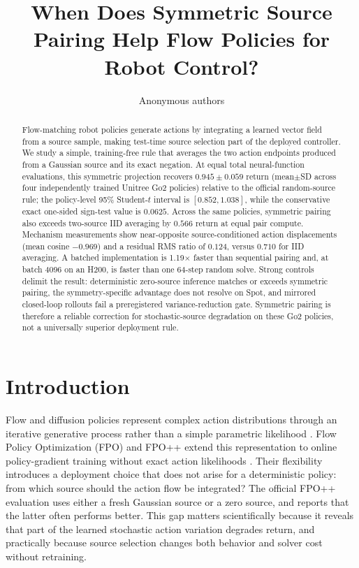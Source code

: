 \documentclass{article}
\title{When Does Symmetric Source Pairing Help Flow Policies for Robot Control?}
\author{Anonymous authors}
\begin{document}
\maketitle

\begin{abstract}
Flow-matching robot policies generate actions by integrating a learned vector
field from a source sample, making test-time source selection part of the
deployed controller. We study a simple, training-free rule that averages the
two action endpoints produced from a Gaussian source and its exact negation.
At equal total neural-function evaluations, this symmetric projection recovers
$0.945\pm0.059$ return (mean$\pm$SD across four independently trained Unitree
Go2 policies) relative to the official random-source rule; the policy-level
95\% Student-$t$ interval is $[0.852,1.038]$, while the conservative exact
one-sided sign-test value is $0.0625$. Across the same policies, symmetric
pairing also exceeds two-source IID averaging by $0.566$ return at equal pair
compute. Mechanism measurements show near-opposite source-conditioned action
displacements (mean cosine $-0.969$) and a residual RMS ratio of $0.124$, versus
$0.710$ for IID averaging. A batched implementation is 1.19$\times$ faster
than sequential pairing and, at batch 4096 on an H200, is faster than one
64-step random solve. Strong controls delimit the result: deterministic
zero-source inference matches or exceeds symmetric pairing, the
symmetry-specific advantage does not resolve on Spot, and mirrored closed-loop
rollouts fail a preregistered variance-reduction gate. Symmetric pairing is
therefore a reliable correction for stochastic-source degradation on these Go2
policies, not a universally superior deployment rule.
\end{abstract}

\section{Introduction}

Flow and diffusion policies represent complex action distributions through an
iterative generative process rather than a simple parametric likelihood
\citep{chi2023diffusionpolicy,lipman2022flowmatching}. Flow Policy Optimization
(FPO) and FPO++ extend this representation to online policy-gradient training
without exact action likelihoods \citep{mcallister2025flowpolicy,yi2026flowcontrol}.
Their flexibility introduces a deployment choice that does not arise for a
deterministic policy: from which source should the action flow be integrated?
The official FPO++ evaluation uses either a fresh Gaussian source or a zero
source, and reports that the latter often performs better. This gap matters
scientifically because it reveals that part of the learned stochastic action
variation degrades return, and practically because source selection changes
both behavior and solver cost without retraining.
\end{document}
